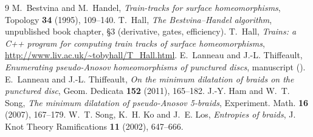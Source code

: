 \documentclass[12pt]{amsart}
\theoremstyle{plain}
\theoremstyle{definition}
\begin{document}
\begin{thebibliography}{9}
 M.~Bestvina and M.~Handel, \emph{Train-tracks for
  surface homeomorphisms}, Topology \textbf{34} (1995), 109--140.
 T.~Hall, \emph{The Bestvina--Handel algorithm},
  unpublished book chapter, \S3 (derivative, gates, efficiency).
 T.~Hall, \emph{Trains: a C++ program for computing
  train tracks of surface homeomorphisms},
  \url{http://www.liv.ac.uk/~tobyhall/T_Hall.html}.
 E.~Lanneau and J.-L. Thiffeault, \emph{Enumerating
  pseudo-Anosov homeomorphisms of punctured discs}, manuscript
  ().
 E.~Lanneau and J.-L. Thiffeault, \emph{On the
  minimum dilatation of braids on the punctured disc}, Geom. Dedicata
  \textbf{152} (2011), 165--182.
 J.-Y. Ham and W.~T. Song, \emph{The minimum dilatation
  of pseudo-Anosov 5-braids}, Experiment. Math. \textbf{16} (2007),
  167--179.
 W.~T. Song, K.~H. Ko and J.~E. Los, \emph{Entropies of
  braids}, J. Knot Theory Ramifications \textbf{11} (2002), 647--666.
\end{thebibliography}
\end{document}
